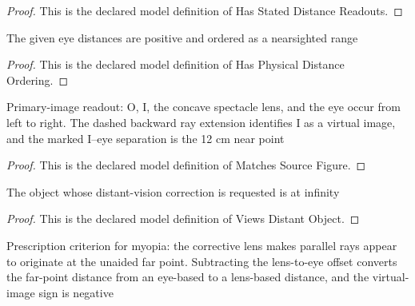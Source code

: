 \begin{proof}
  This is the declared model definition of Has Stated Distance Readouts.
\end{proof}
\begin{definition}
  \label{def:physics:phyx-mini-0130:phyxminiproblems-problemphyxmini0130-hasphysicaldistanceordering}
  The given eye distances are positive and ordered as a nearsighted range
\end{definition}
\begin{proof}
  This is the declared model definition of Has Physical Distance Ordering.
\end{proof}
\begin{definition}
  \label{def:physics:phyx-mini-0130:phyxminiproblems-problemphyxmini0130-matchessourcefigure}
  Primary-image readout: O, I, the concave spectacle lens, and the eye occur from left to right. The dashed backward ray extension identifies I as a virtual image, and the marked I--eye separation is the 12 cm near point
\end{definition}
\begin{proof}
  This is the declared model definition of Matches Source Figure.
\end{proof}
\begin{definition}
  \label{def:physics:phyx-mini-0130:phyxminiproblems-problemphyxmini0130-viewsdistantobject}
  The object whose distant-vision correction is requested is at infinity
\end{definition}
\begin{proof}
  This is the declared model definition of Views Distant Object.
\end{proof}
\begin{definition}
  \label{def:physics:phyx-mini-0130:phyxminiproblems-problemphyxmini0130-formsvirtualimageatunaidedfarpoint}
  Prescription criterion for myopia: the corrective lens makes parallel rays appear to originate at the unaided far point. Subtracting the lens-to-eye offset converts the far-point distance from an eye-based to a lens-based distance, and the virtual-image sign is negative
\end{definition}
